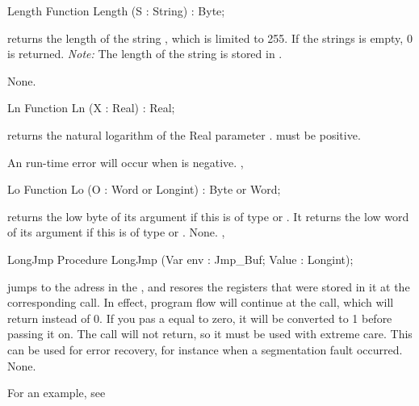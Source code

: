 \documentclass{report}
\begin{document}
\html{}
\begin{function}{Length}
\Declaration
Function Length (S : String) : Byte;

\Description
{} returns the length of the string ,
which is limited to 255. If the strings  is empty, 0 is returned.
{\em Note:} The length of the string  is stored in .

\Errors
None.
\SeeAlso
{}
\end{function}
\html{}
\begin{function}{Ln}
\Declaration
Function Ln (X : Real) : Real;

\Description

 returns the natural logarithm of the Real parameter .
 must be positive.

\Errors
An run-time error will occur when  is negative.
\SeeAlso
{}, 
\end{function}
\html{}
\begin{function}{Lo}
\Declaration
Function Lo (O : Word or Longint) : Byte or Word;

\Description
{} returns the low byte of its argument if this is of type
 or
. It returns the low word of its argument if this is of type
 or .
\Errors
None.
\SeeAlso
{}, 
\end{function}
\html{}
\begin{procedure}{LongJmp}
\Declaration
Procedure LongJmp (Var env : Jmp\_Buf; Value : Longint);

\Description

 jumps to the adress in the  ,
and resores the registers that were stored in it at the corresponding
 call.
In effect, program flow will continue at the  call, which will
return  instead of 0. If you pas a  equal to zero, it will be
converted to 1 before passing it on. The call will not return, so it must be
used with extreme care.
This can be used for error recovery, for instance when a segmentation fault
occurred.
\Errors
None.
\SeeAlso
{}
\end{procedure}
For an example, see 
\end{document}
